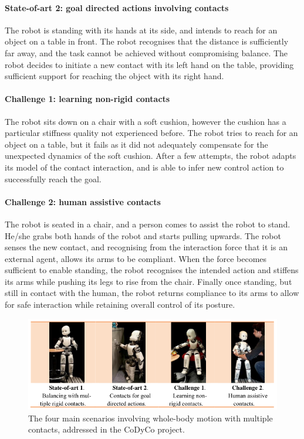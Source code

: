 \documentclass[final,5p,twocolumn]{elsarticle}
\begin{document}
\paragraph{State-of-art 2: goal directed actions involving contacts} The robot is standing with its hands at its side, and intends to reach for an object on a table in front.  The robot recognises that the distance is sufficiently far away, and the task cannot be achieved without compromising balance.  The robot decides to initiate a new contact with its left hand on the table, providing sufficient support for reaching the object with its right hand.

\paragraph{Challenge 1: learning non-rigid contacts} The robot sits down on a chair with a soft cushion, however the cushion has a particular stiffness quality not experienced before. The robot tries to reach for an object on a table, but it fails as it did not adequately compensate for the unexpected dynamics of the soft cushion. After a few attempts, the robot adapts its model of the contact interaction, and is able to infer new control action to successfully reach the goal.

\paragraph{Challenge 2: human assistive contacts} The robot is seated in a chair, and a person comes to assist the robot to stand. He/she grabs both hands of the robot and starts pulling upwards.  The robot senses the new contact, and recognising from the interaction force that it is an external agent, allows its arms to be compliant.  When the force becomes sufficient to enable standing, the robot recognises the intended action and stiffens its arms while pushing its legs to rise from the chair. Finally once standing, but still in contact with the human, the robot returns compliance to its arms to allow for safe interaction while retaining overall control of its posture.

\begin{figure}
\centering
\includegraphics[width=1.0\linewidth]{./images/scenarios.png}
\caption{The four main scenarios involving whole-body motion with multiple contacts, addressed in the CoDyCo project.}
\label{fig:scenarios}
\end{figure}
\end{document}
